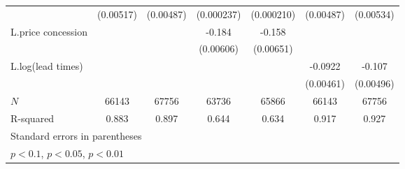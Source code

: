 {\begin{tabular}{l*{6}{c}}
            &   (0.00517)         &   (0.00487)         &  (0.000237)         &  (0.000210)         &   (0.00487)         &   (0.00534)         \\
\addlinespace
L.price concession&                     &                     &      -0.184\sym{***}&      -0.158\sym{***}&                     &                     \\
            &                     &                     &   (0.00606)         &   (0.00651)         &                     &                     \\
\addlinespace
L.log(lead times)   &                     &                     &                     &                     &     -0.0922\sym{***}&      -0.107\sym{***}\\
            &                     &                     &                     &                     &   (0.00461)         &   (0.00496)         \\
\midrule
\(N\)       &       66143         &       67756         &       63736         &       65866         &       66143         &       67756         \\
R-squared   &       0.883         &       0.897         &       0.644         &       0.634         &       0.917         &       0.927         \\
\bottomrule
\multicolumn{7}{l}{\footnotesize Standard errors in parentheses}\\
\multicolumn{7}{l}{\footnotesize \sym{*} \(p<0.1\), \sym{**} \(p<0.05\), \sym{***} \(p<0.01\)}\\
\end{tabular}
}
